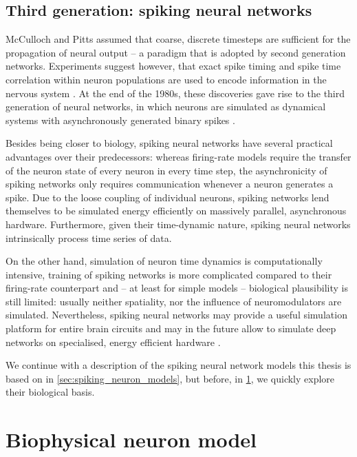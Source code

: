 \subsection{Third generation: spiking neural networks}

McCulloch and Pitts assumed that coarse, discrete timesteps are sufficient for the propagation of neural output -- a paradigm that is adopted by second generation networks. Experiments suggest however, that exact spike timing and spike time correlation within neuron populations are used to encode information in the nervous system \cite{shadlen1994noise}. At the end of the 1980s, these discoveries gave rise to the third generation of neural networks, in which neurons are simulated as dynamical systems with asynchronously generated binary spikes \cite{maass1997networks}.

Besides being closer to biology, spiking neural networks have several practical advantages over their predecessors: whereas firing-rate models require the transfer of the neuron state of every neuron in every time step, the asynchronicity of spiking networks only requires communication whenever a neuron generates a spike. Due to the loose coupling of individual neurons, spiking networks lend themselves to be simulated energy efficiently on massively parallel, asynchronous hardware. Furthermore, given their time-dynamic nature, spiking neural networks intrinsically process time series of data.

On the other hand, simulation of neuron time dynamics is computationally intensive, training of spiking networks is more complicated compared to their firing-rate counterpart and -- at least for simple models -- biological plausibility is still limited: usually neither spatiality, nor the influence of neuromodulators are simulated. Nevertheless, spiking neural networks may provide a useful simulation platform for entire brain circuits \cite{johansson2007towards} and may in the future allow to simulate deep networks on specialised, energy efficient hardware \cite{hasler2013finding,schmidhuber2015deep}.

We continue with a description of the spiking neural network models this thesis is based on in \cref{sec:spiking_neuron_models}, but before, in \cref{sec:biophysical_neuron_model}, we quickly explore their biological basis.

%
%

\section{Biophysical neuron model}
\label{sec:biophysical_neuron_model}

